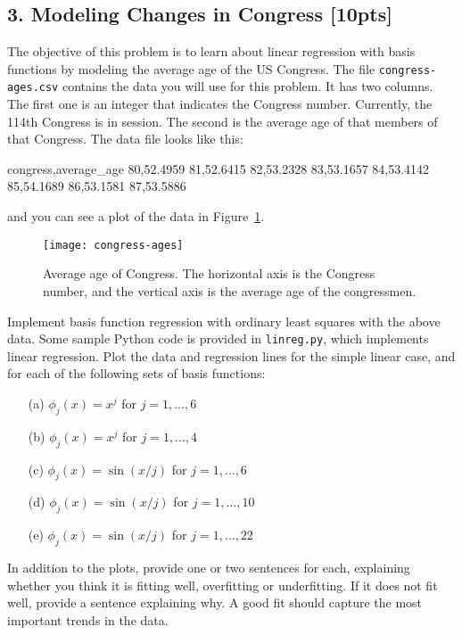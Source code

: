 \documentclass[submit]{harvardml}
\begin{document}
\subsection*{3. Modeling Changes in Congress [10pts]}
 The objective of this problem is to learn about linear regression with basis
 functions by modeling the average age of the US Congress. The file
 \verb|congress-ages.csv| contains the data you will use for this problem.  It
 has two columns.  The first one is an integer that indicates the Congress
 number. Currently, the 114th Congress is in session. The second is the average
 age of that members of that Congress.  The data file looks like this:
\begin{csv}
congress,average_age
80,52.4959
81,52.6415
82,53.2328
83,53.1657
84,53.4142
85,54.1689
86,53.1581
87,53.5886
\end{csv}
and you can see a plot of the data in Figure~\ref{fig:congress}.

\begin{figure}[h]
\centering
\texttt{[image: congress-ages]}
\caption{Average age of Congress.  The horizontal axis is the Congress number, and the vertical axis is the average age of the congressmen.}
\label{fig:congress}
\end{figure}

\begin{problem}
Implement basis function regression with ordinary least squares with the above
data. Some sample Python code is provided in \verb|linreg.py|, which implements
linear regression.  Plot the data and regression lines for the simple linear
case, and for each of the following sets of basis functions:
\begin{itemize}
	\item[(a)] $\phi_j(x) = x^j$ for $j=1, \ldots, 6$
	\item[(b)] $\phi_j(x) = x^j$ for $j=1, \ldots, 4$
	\item[(c)] $\phi_j(x) = \sin(x / j)$ for $j=1, \ldots, 6$
	\item[(d)] $\phi_j(x) = \sin(x / j)$ for $j=1, \ldots, 10$
	\item[(e)] $\phi_j(x) = \sin(x / j)$ for $j=1, \ldots, 22$
\end{itemize}
  In addition to the plots, provide one or two sentences for each, explaining
  whether you think it is fitting well, overfitting or underfitting.  If it does
  not fit well, provide a sentence explaining why. A good fit should capture the
  most important trends in the data.
	\end{problem}
\end{document}

